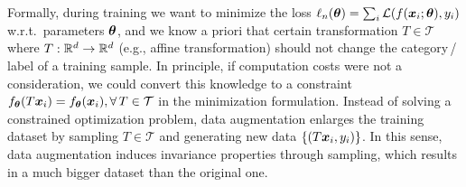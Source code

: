 Formally, during training we want to minimize the loss $\ell_{n}(\text{\boldmath $\theta$})=\sum_{i}\mathcal{L}(f(\text{\boldmath $x$}_{i};\text{\boldmath $\theta$}),y_{i})$
w.r.t.~parameters $\text{\boldmath $\theta$}$, and we know a priori that certain transformation
$T\in\mathcal{T}$ where $T:\mathbb{R}^{d}\to\mathbb{R}^{d}$ (e.g., affine transformation)
should not change the category$\,$/$\,$label of a training sample. In principle,
if computation costs were not a consideration, we could convert this
knowledge to a constraint $f_{\text{\boldmath $\theta$}}(T\text{\boldmath $x$}_{i})=f_{\text{\boldmath $\theta$}}(\text{\boldmath $x$}_{i}),\forall\,T\in\mathcal{T}$
in the minimization formulation. Instead of solving a constrained
optimization problem, data augmentation enlarges the training dataset
by sampling $T\in\mathcal{T}$ and generating new data $\{(T\text{\boldmath $x$}_{i},y_{i})\}$.
In this sense, data augmentation induces invariance properties through sampling, which results in a much bigger dataset than the original one. 






%



